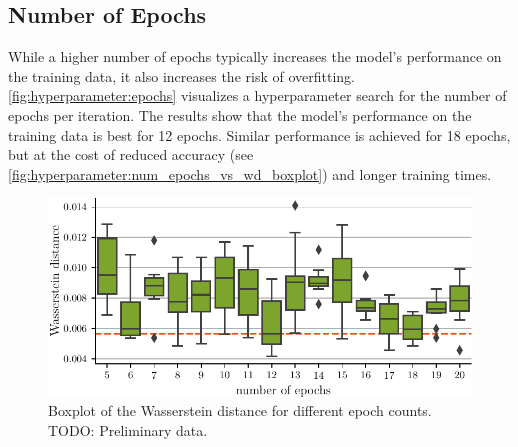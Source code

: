 \subsection{Number of Epochs}
While a higher number of epochs typically increases the model's performance on the training data,
it also increases the risk of overfitting.
%
\autoref{fig:hyperparameter:epochs} visualizes a hyperparameter search for the number of epochs per \dsea{} iteration.
The results show that the model's performance on the training data is best for \num{12} epochs.
Similar performance is achieved for \num{18} epochs,
  but at the cost of
    reduced accuracy
      (see \autoref{fig:hyperparameter:num_epochs_vs_wd_boxplot})
    and longer training times.

\begin{figure}
  \centering
  \includegraphics[width=\textwidth]{content/plots/hyperparam/num_epochs_vs_wd_boxplot_lessheight.pdf}
  \caption{Boxplot of the Wasserstein distance for different epoch counts. TODO: Preliminary data.}
  \label{fig:hyperparameter:epochs}
\end{figure}

